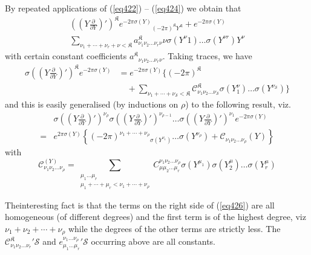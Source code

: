 By repeated applications of (\ref{eq422}) -- (\ref{eq424}) we obtain that 
\begin{gather*}
((Y \frac{\partial} {\partial Y})')^\mathfrak{K} e^{-2 \pi \sigma
    (Y)}{_{(- 2 \pi) ^\mathfrak{K} Y ^\mathfrak{K}}} + e^{- 2 \pi \sigma
    (Y)}\\
 \sum_{\nu_1 +\cdots+ \nu_r + \nu < \mathfrak{K}}
  a^\mathfrak{K}_{\nu_1 \nu_2 \dots \nu_r \nu} \nu \sigma (Y^\nu 1)
  \dots \sigma (Y^{\nu r}) Y^\nu \tag{425}\label{eq425} 
\end{gather*}
with certain constant coefficients $a^\mathfrak{K}{_{\nu_1 \nu_2 \dots 
    \nu_r \nu}}$. Taking traces, we have 
\begin{align*}
 \sigma ((Y \frac{\partial}
{\partial Y})')^\mathfrak{K} e^{-2 \pi \sigma (Y)} &=e^{-2 \pi \sigma
  (Y)} \{ (-2 \pi)^\mathfrak{K}\\[3pt]
&\quad  + \sum_{\nu_1 +\cdots+ \nu_\mathscr{S}
  < \mathfrak{K}}  \mathscr{C}^{\mathfrak{K}}_{\nu_1 \nu_2 \dots
    \nu_\mathscr{S}} \sigma (Y^\nu_1) \dots \sigma
(Y^{\nu_\mathscr{S}})\} 
\end{align*}
and this is easily generalised (by inductions
on $\rho$) to the following result, viz. 
\begin{align*}
& \sigma ((Y \frac{\partial} {\partial Y})')^{\nu_\rho} \sigma ((Y
\frac{\partial} {\partial Y})')^{\nu_{\rho-1}} \dots \sigma ((Y
\frac{\partial} {\partial Y})')^{\nu_1} e ^{-2 \pi \sigma (Y)} \\[4pt]
= & e^{2  \pi \sigma (Y)} \left\{ (-2 \pi)^{\nu_1 + \cdots+ \nu_\rho}
     {_{\sigma (Y^{\nu_1})} \dots \sigma (Y^{\nu_\rho})} +
     \mathscr{C}_{ \nu_1 \nu_2 \dots \nu_\rho }(Y) \right\} \tag{426}\label{eq426} 
\end{align*}
with
$$
\mathscr{C}_{\nu_1 \nu_2 \dots \nu_\rho}^{(Y)} = \sum_{\substack{\mu_1
    \dots \mu_r \\ \mu_1 +\cdots+ \mu_r < \nu_1 +\cdots+ \nu_\rho}}
C^{\nu_1 \nu_2 \dots \nu_\rho}_{\mu \mu_2 \dots \mu_r}
\sigma(Y^{\mu_1}) \sigma(Y^\mu_2) \dots \sigma (Y^\mu_r) 
$$

The\pageoriginale interesting fact is that the terms on the right side
of (\ref{eq426}) are all homogeneous (of different degrees) and the
first term is of the highest degree, viz $\nu_1 + \nu_2 + \cdots+
\nu_\rho$ while the degrees of the other terms are strictly less. The 
$\mathscr{C}^\mathfrak{K}_{\nu_1 \nu_2 \dots \nu_r}{'}\mathscr{S}$ and
$e^{\nu_1 \dots \nu_\rho}_{\mu_1 \dots \mu_r}{'}\mathscr{S}$ occurring
above are all constants.  

